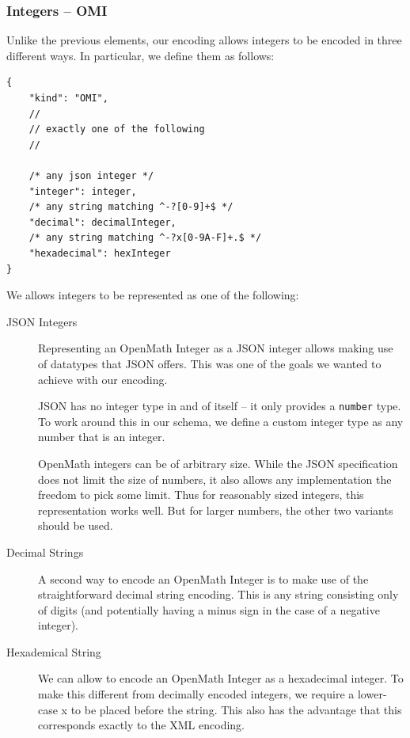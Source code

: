 \subsubsection{Integers -- OMI}

Unlike the previous elements, our encoding allows integers to be encoded in three different ways. 
In particular, we define them as follows:
\\\begin{minipage}{\linewidth}\begin{lstlisting}
{
    "kind": "OMI",
    //
    // exactly one of the following
    //

    /* any json integer */
    "integer": integer,
    /* any string matching ^-?[0-9]+$ */
    "decimal": decimalInteger,
    /* any string matching ^-?x[0-9A-F]+.$ */
    "hexadecimal": hexInteger
}
\end{lstlisting}\end{minipage}

We allows integers to be represented as one of the following:
\begin{description}
    \item[JSON Integers]
    Representing an OpenMath Integer as a JSON integer allows making use of datatypes that JSON offers. 
    This was one of the goals we wanted to achieve with our encoding. 
    
    JSON has no integer type in and of itself -- it only provides a \texttt{number} type. 
    To work around this in our schema, we define a custom integer type as any number that is an integer. 
        
    OpenMath integers can be of arbitrary size. 
    While the JSON specification does not limit the size of numbers, it also allows any implementation the freedom to pick some limit. 
    Thus for reasonably sized integers, this representation works well. 
    But for larger numbers, the other two variants should be used. 

    \item[Decimal Strings]
    A second way to encode an OpenMath Integer is to make use of the straightforward decimal string encoding. 
    This is any string consisting only of digits (and potentially having a minus sign in the case of a negative integer). 

    \item[Hexademical String]
    We can allow to encode an OpenMath Integer as a hexadecimal integer. 
    To make this different from decimally encoded integers, we require a lower-case x to be placed before the string. 
    This also has the advantage that this corresponds exactly to the XML encoding.     
\end{description}

